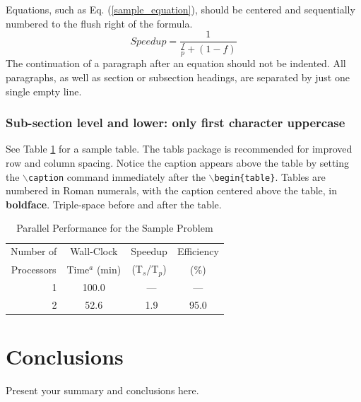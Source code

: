 \documentclass{ansjournal}
\begin{document}
Equations, such as Eq. (\ref{sample_equation}), should be centered and
sequentially numbered to the flush right of the formula.
\begin{equation}
  \label{sample_equation}
  Speedup = \frac{1}{\frac{f}{p} + (1-f)}
\end{equation}
The continuation of a paragraph after an equation should not be indented.
All paragraphs, as well as section or subsection headings, are separated by
just one single empty line.


\subsubsection{Sub-section level and lower: only first character uppercase}

See Table \ref{table:example} for a sample table.  The tabls package is
recommended for improved row and column spacing.  Notice the caption appears
above the table by setting the \texttt{$\backslash$caption} command immediately
after the \texttt{$\backslash$begin\{table\}}. Tables are numbered in Roman
numerals, with the caption centered above the table, in {\bf boldface}.
Triple-space before and after the table.

\vspace{16pt}
\begin{table}[!htb]
\centering
\caption{Parallel Performance for the Sample Problem}
\label{table:example}
\vspace{14pt}
\begin{tabular}{||r||c|c|c||} \hline \hline
 \multicolumn{1}{||c||}{Number of} &
 \multicolumn{1}{c|}{Wall-Clock} &
 \multicolumn{1}{c|}{Speedup} &
 \multicolumn{1}{c||}{Efficiency} \\
 \multicolumn{1}{||c||}{Processors} &
 \multicolumn{1}{c|}{Time$^{a}$ (min)} &
 \multicolumn{1}{c|}{(T$_{s}$/T$_{p}$)} &
 \multicolumn{1}{c||}{(\%)} \\ \hline\hline
\ 1 &  100.0 & \ ---    & ---  \\ \hline
\ 2 &   52.6 & \ 1.9    & 95.0 \\ \hline \hline
\end{tabular}
\end{table}
\vspace{16pt}


\section{Conclusions}

Present your summary and conclusions here.
\end{document}
